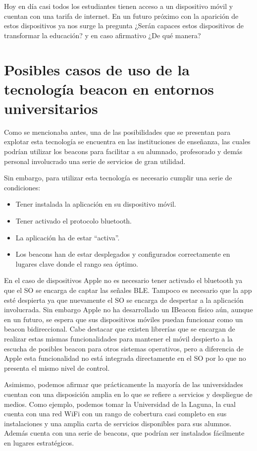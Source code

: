 Hoy en día casi todos los estudiantes tienen acceso a un dispositivo móvil y cuentan con una tarifa de internet. En un futuro próximo con la aparición de estos dispositivos ya nos surge la pregunta ¿Serán capaces estos dispositivos de transformar la educación? y en caso afirmativo ¿De qué manera? 

\section {Posibles casos de uso de la tecnología beacon en entornos universitarios}

Como se mencionaba antes, una de las posibilidades que se presentan para explotar esta tecnología se encuentra en las instituciones de enseñanza, las cuales podrían utilizar los beacons para facilitar a su alumnado, profesorado y demás personal involucrado  una serie de servicios de gran utilidad.


Sin embargo, para utilizar esta tecnología es necesario cumplir una serie de condiciones:

\begin{itemize}
\item Tener instalada la aplicación en su dispositivo móvil.
\item Tener activado el protocolo bluetooth.
\item La aplicación ha de estar "`activa"'.
\item Los beacons han de estar desplegados y configurados correctamente en lugares clave donde el rango sea óptimo.
\end{itemize}

En el caso de dispositivos Apple no es necesario tener activado el bluetooth ya que el SO se encarga de captar las señales BLE. Tampoco es necesario que la app esté despierta ya que nuevamente el SO se encarga de despertar a la aplicación involucrada. Sin embargo Apple no ha desarrollado un IBeacon físico aún, aunque en un futuro, se espera que sus dispositivos móviles puedan funcionar como un beacon bidireccional. Cabe destacar que existen librerías que se encargan de realizar estas mismas funcionalidades para mantener el móvil despierto a la escucha de posibles beacon para otros sistemas operativos, pero a diferencia de Apple esta funcionalidad no está integrada directamente en el SO por lo que no presenta el mismo nivel de control.


Asimismo, podemos afirmar que prácticamente la mayoría de las universidades cuentan con una disposición amplia en lo que se refiere a servicios y despliegue de medios. Como ejemplo, podemos tomar la Universidad de la Laguna, la cual cuenta con una red WiFi con un rango de cobertura casi completo en sus instalaciones y una amplia carta de servicios disponibles para sus alumnos. Además cuenta con una serie de beacons, que podrían ser instalados fácilmente en lugares estratégicos. 

